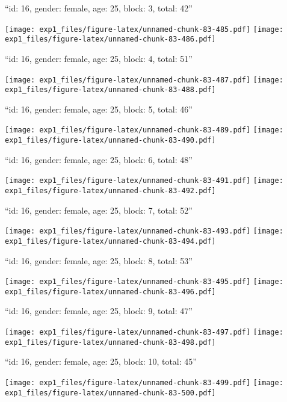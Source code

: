 \documentclass[11pt,,]{article}
\begin{document}
\newpage
[1] 

``id: 16, gender: female, age: 25, block: 3, total: 42''

\texttt{[image: exp1\_files/figure-latex/unnamed-chunk-83-485.pdf]}
\texttt{[image: exp1\_files/figure-latex/unnamed-chunk-83-486.pdf]}

\newpage
[1] 

``id: 16, gender: female, age: 25, block: 4, total: 51''

\texttt{[image: exp1\_files/figure-latex/unnamed-chunk-83-487.pdf]}
\texttt{[image: exp1\_files/figure-latex/unnamed-chunk-83-488.pdf]}

\newpage
[1] 

``id: 16, gender: female, age: 25, block: 5, total: 46''

\texttt{[image: exp1\_files/figure-latex/unnamed-chunk-83-489.pdf]}
\texttt{[image: exp1\_files/figure-latex/unnamed-chunk-83-490.pdf]}

\newpage
[1] 

``id: 16, gender: female, age: 25, block: 6, total: 48''

\texttt{[image: exp1\_files/figure-latex/unnamed-chunk-83-491.pdf]}
\texttt{[image: exp1\_files/figure-latex/unnamed-chunk-83-492.pdf]}

\newpage
[1] 

``id: 16, gender: female, age: 25, block: 7, total: 52''

\texttt{[image: exp1\_files/figure-latex/unnamed-chunk-83-493.pdf]}
\texttt{[image: exp1\_files/figure-latex/unnamed-chunk-83-494.pdf]}

\newpage
[1] 

``id: 16, gender: female, age: 25, block: 8, total: 53''

\texttt{[image: exp1\_files/figure-latex/unnamed-chunk-83-495.pdf]}
\texttt{[image: exp1\_files/figure-latex/unnamed-chunk-83-496.pdf]}

\newpage
[1] 

``id: 16, gender: female, age: 25, block: 9, total: 47''

\texttt{[image: exp1\_files/figure-latex/unnamed-chunk-83-497.pdf]}
\texttt{[image: exp1\_files/figure-latex/unnamed-chunk-83-498.pdf]}

\newpage
[1] 

``id: 16, gender: female, age: 25, block: 10, total: 45''

\texttt{[image: exp1\_files/figure-latex/unnamed-chunk-83-499.pdf]}
\texttt{[image: exp1\_files/figure-latex/unnamed-chunk-83-500.pdf]}
\end{document}

